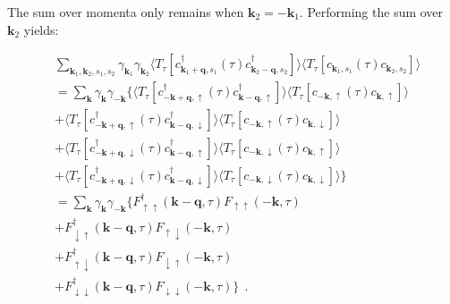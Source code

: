 \documentclass[a4j]{jsarticle}
\begin{document}
The sum over momenta only remains when $\bm{k}_{2}=-\bm{k}_{1}$.
Performing the sum over $\bm{k}_{2}$ yields:

\begin{align}
	 &
	\sum_{\bm{k}_{1} , \bm{k}_{2} , s_{1} ,s_{2} }
	\gamma_{\bm{k}_{1}}
	\gamma_{\bm{k}_{2}}
	\langle T_{\tau} [
			c_{ \bm{k}_{1}+\bm{q} , s_{1} }^{\dagger} (\tau)
			c_{ \bm{k}_{2}-\bm{q} , s_{2} }^{\dagger}
		] \rangle
	\langle T_{\tau} [
			c_{ \bm{k}_{1} , s_{1} } (\tau)
			c_{ \bm{k}_{2} , s_{2} }
		] \rangle
	\\ &=
	\sum_{ \bm{k} }
	\gamma_{\bm{k}}
	\gamma_{-\bm{k}}
	\Big\{
	\langle T_{\tau} [
			c_{ - \bm{k} + \bm{q} , \uparrow }^{\dagger} (\tau)
			c_{ \bm{k} - \bm{q} , \uparrow }^{\dagger}
		] \rangle
	\langle T_{\tau} [
			c_{ - \bm{k} , \uparrow } (\tau)
			c_{ \bm{k} , \uparrow }
		] \rangle
	\nonumber \\ &+
	\langle T_{\tau} [
			c_{ - \bm{k} + \bm{q} , \uparrow }^{\dagger} (\tau)
			c_{ \bm{k} - \bm{q} , \downarrow }^{\dagger}
		] \rangle
	\langle T_{\tau} [
			c_{ - \bm{k} , \uparrow } (\tau)
			c_{ \bm{k} , \downarrow }
		] \rangle
	\nonumber \\[2mm] &+
	\langle T_{\tau} [
			c_{ - \bm{k} + \bm{q} , \downarrow }^{\dagger} (\tau)
			c_{ \bm{k} - \bm{q} , \uparrow }^{\dagger}
		] \rangle
	\langle T_{\tau} [
			c_{ - \bm{k} , \downarrow } (\tau)
			c_{ \bm{k} , \uparrow }
		] \rangle
	\nonumber \\[2mm] &+
	\langle T_{\tau} [
			c_{ - \bm{k} + \bm{q} , \downarrow }^{\dagger} (\tau)
			c_{ \bm{k} - \bm{q} , \downarrow }^{\dagger}
		] \rangle
	\langle T_{\tau} [
			c_{ - \bm{k} , \downarrow } (\tau)
			c_{ \bm{k} , \downarrow }
		] \rangle
	\Big\}
	\nonumber \\[2mm]
	 & =
	\sum_{ \bm{k} }
	\gamma_{\bm{k}}
	\gamma_{-\bm{k}}
	\Big\{
	F_{ \uparrow \uparrow }^{\dagger}( \bm{k} - \bm{q} , \tau )
	F_{ \uparrow \uparrow } ( - \bm{k} , \tau )
	\nonumber \\ &+
	F_{ \downarrow \uparrow }^{\dagger}( \bm{k} - \bm{q} , \tau )
	F_{ \uparrow \downarrow } ( - \bm{k} , \tau )
	\nonumber \\[2mm] &+
	F_{ \uparrow \downarrow }^{\dagger}( \bm{k} - \bm{q} , \tau )
	F_{ \downarrow \uparrow } ( - \bm{k} , \tau )
	\nonumber \\[2mm] &+
	F_{ \downarrow \downarrow }^{\dagger}( \bm{k} - \bm{q} , \tau )
	F_{ \downarrow \downarrow } ( - \bm{k} , \tau )
	\Big\}
	\ \ .
\end{align}
\end{document}
